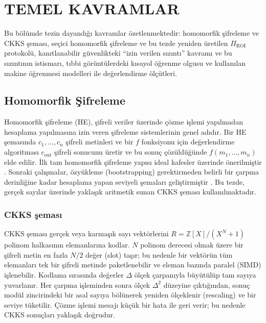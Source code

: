 \chapter{TEMEL KAVRAMLAR}\label{CH2}

Bu bölümde tezin dayandığı kavramlar özetlenmektedir: homomorfik şifreleme ve CKKS şeması, seçici homomorfik şifreleme ve bu tezde yeniden üretilen $\Pi_{\mathrm{ROI}}$ protokolü, kanıtlanabilir güvenlikteki ``izin verilen sızıntı'' kavramı ve bu sızıntının istismarı, tıbbi görüntülerdeki kısayol öğrenme olgusu ve kullanılan makine öğrenmesi modelleri ile değerlendirme ölçütleri.

\section{Homomorfik Şifreleme}\label{sec:he}

Homomorfik şifreleme (HE), şifreli veriler üzerinde çözme işlemi yapılmadan hesaplama yapılmasına izin veren şifreleme sistemlerinin genel adıdır. Bir HE şemasında $c_1,\ldots,c_n$ şifreli metinleri ve bir $f$ fonksiyonu için değerlendirme algoritması $c_{\mathrm{out}}$ şifreli sonucunu üretir ve bu sonuç çözüldüğünde $f(m_1,\ldots,m_n)$ elde edilir. İlk tam homomorfik şifreleme yapısı ideal kafesler üzerinde önerilmiştir \cite{gentry2009fhe}. Sonraki çalışmalar, özyükleme (bootstrapping) gerektirmeden belirli bir çarpma derinliğine kadar hesaplama yapan seviyeli şemaları geliştirmiştir \cite{brakerski2012leveled}. Bu tezde, gerçek sayılar üzerinde yaklaşık aritmetik sunan CKKS şeması kullanılmaktadır.

\subsection{CKKS şeması}\label{sec:ckks}

CKKS şeması \cite{cheon2017ckks} gerçek veya karmaşık sayı vektörlerini $R = \mathbb{Z}[X]/(X^N+1)$ polinom halkasının elemanlarına kodlar. $N$ polinom derecesi olmak üzere bir şifreli metin en fazla $N/2$ değer (slot) taşır; bu nedenle bir vektörün tüm elemanları tek bir şifreli metinde paketlenebilir ve eleman bazında paralel (SIMD) işlenebilir. Kodlama sırasında değerler $\Delta$ ölçek çarpanıyla büyütülüp tam sayıya yuvarlanır. Her çarpma işleminden sonra ölçek $\Delta^2$ düzeyine çıktığından, sonuç modül zincirindeki bir asal sayıya bölünerek yeniden ölçeklenir (rescaling) ve bir seviye tüketilir. Çözme işlemi mesajı küçük bir hata ile geri verir; bu nedenle CKKS sonuçları yaklaşık doğrudur.

